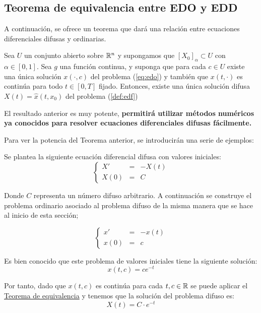 \subsection{Teorema de equivalencia entre EDO y EDD}

A continuación, se ofrece un teorema que dará una relación entre ecuaciones diferenciales difusas y ordinarias.

\begin{teorema}
	\label{teorema:equivalencia}
	Sea $U$ un conjunto abierto sobre $\mathbb R^n$ y supongamos que $[X_0]_\alpha \subset U$ con $\alpha \in [0, 1]$. Sea $g$ una función continua, y suponga que para cada $c \in U$ existe una única solución $x(\cdot, c)$ del problema (\ref{eq:edo}) y también que $x(t, \cdot)$ es continúa para todo $t \in [0, T]$ fijado. Entonces, existe una única solución difusa $X(t) = \hat{x}(t, x_0)$ del problema (\ref{def:edf})
\end{teorema}
El resultado anterior es muy potente, \textbf{permitirá utilizar métodos numéricos ya conocidos para resolver ecuaciones diferenciales difusas fácilmente.}

Para ver la potencia del Teorema anterior, se introducirán una serie de ejemplos:

\begin{ejemplo}
	Se plantea la siguiente ecuación diferencial difusa con valores iniciales:
	\[
		\left\{
			\begin{array}{ccc}
				X' & = & - X(t) \\
				X(0) & =  & C
			\end{array}
		\right.
	\]
	
	Donde $C$ representa un número difuso arbitrario. A continuación se construye el problema ordinario asociado al problema difuso de la misma manera que se hace al inicio de esta sección;
	
	\[
		\left\{
			\begin{array}{ccc}
				x' & = & - x(t) \\
				x(0) & =  & c
			\end{array}
		\right.
	\]
	
	Es bien conocido que este problema de valores iniciales tiene la siguiente solución:
	\[
		x(t, c) = c e^{-t}
	\]
	
	Por tanto, dado que $x(t, c)$ es continúa para cada $t, c \in \mathbb R$ se puede aplicar el \hyperref[teorema:equivalencia]{Teorema de equivalencia} y tenemos que la solución del problema difuso es:
	\[
		X(t) = C \cdot e^{-t}
	\]
\end{ejemplo}

